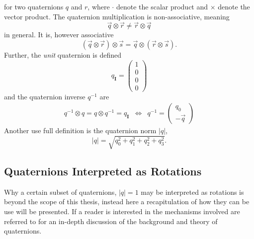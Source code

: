 \documentclass{LTHthesis}
\begin{document}
%
for two quaternions $q$ and $r$, where $\cdot$ denote the scalar product and $\times$ denote the vector product. The quaternion multiplication is non-associative, meaning
%
\begin{equation}
\vec{q}\otimes \vec{r} \neq \vec{r} \otimes \vec{q}
\end{equation}
%
in general. It is, however associative
%
\begin{equation}
(\vec{q}\otimes\vec{r})\otimes\vec{s} = \vec{q}\otimes(\vec{r}\otimes\vec{s}).
\label{equation:quat_asso}
\end{equation} 
%
Further, the \emph{unit} quaternion is defined
%
\begin{equation}
{q_{\mathbf{I}}}=\left(\begin{array}{c}1\\ 0 \\ 0 \\ 0\end{array}\right)
\end{equation}
%
and the quaternion inverse $q^{-1}$ are
%
\begin{eqnarray}
q^{-1}\otimes q = q\otimes q^{-1} = q_{\mathbf{I}} &\Leftrightarrow& q^{-1} = \left(\begin{array}{c}q_0\\ -\vec{q}\end{array}\right)
\end{eqnarray}
%
Another use full definition is the quaternion norm $|q|$,
%
\begin{equation}
|q| = \sqrt{q_0^2+q_1^2+q_2^2+q_3^2 }.
\end{equation} 
%
\subsection{Quaternions Interpreted as Rotations}
%
Why a certain subset of quaternions, $|q|=1$ may be interpreted as rotations is beyond the scope of this thesis, instead here a recapitulation of how they can be use will be presented. If a reader is interested in the mechanisms involved are referred to \cite{kuip98} for an in-depth discussion of the background and theory of quaternions. 
\end{document}

